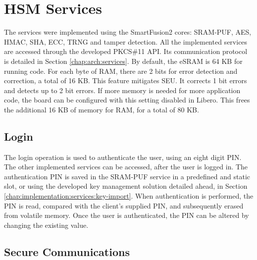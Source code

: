 
\section{HSM Services}\label{chap:implementation:services}

The services were implemented using the SmartFusion2 cores: SRAM-PUF, AES, HMAC, SHA, ECC, TRNG and tamper detection.
All the implemented services are accessed through the developed PKCS\#11 API. Its communication protocol is detailed in Section \ref{chap:arch:services}.
By default, the eSRAM is 64 KB for running code. For each byte of \ac{RAM}, there are 2 bits for error detection and correction, a total of 16 KB. This feature mitigates \ac{SEU}. It corrects 1 bit errors and detects up to 2 bit errors. If more memory is needed for more application code, the board can be configured with this setting disabled in Libero. This frees the additional 16 KB of memory for RAM, for a total of 80 KB.

\subsection{Login}\label{chap:implementation:services:authentication}

The login operation is used to authenticate the user, using an eight digit PIN. The other implemented services can be accessed, after the user is logged in.
The authentication PIN is saved in the SRAM-PUF service in a predefined and static slot, or using the developed key management solution detailed ahead, in Section \ref{chap:implementation:services:key-import}. When authentication is performed, the PIN is read, compared with the client's supplied PIN, and subsequently erased from volatile memory.
Once the user is authenticated, the PIN can be altered by changing the existing value.

\subsection{Secure Communications}\label{chap:implementation:services:secure}

